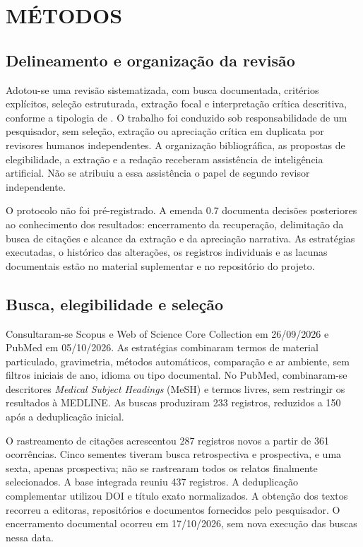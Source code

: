 \section{MÉTODOS}
\subsection{Delineamento e organização da revisão}

Adotou-se uma revisão sistematizada, com busca documentada, critérios explícitos, seleção estruturada, extração focal e interpretação crítica descritiva, conforme a tipologia de \textcite{grant2009}. O trabalho foi conduzido sob responsabilidade de um pesquisador, sem seleção, extração ou apreciação crítica em duplicata por revisores humanos independentes. A organização bibliográfica, as propostas de elegibilidade, a extração e a redação receberam assistência de inteligência artificial. Não se atribuiu a essa assistência o papel de segundo revisor independente.

O protocolo não foi pré-registrado. A emenda 0.7 documenta decisões posteriores ao conhecimento dos resultados: encerramento da recuperação, delimitação da busca de citações e alcance da extração e da apreciação narrativa. As estratégias executadas, o histórico das alterações, os registros individuais e as lacunas documentais estão no material suplementar e no repositório do projeto.

\subsection{Busca, elegibilidade e seleção}

Consultaram-se Scopus e Web of Science Core Collection em 26/09/2026 e PubMed em 05/10/2026. As estratégias combinaram termos de material particulado, gravimetria, métodos automáticos, comparação e ar ambiente, sem filtros iniciais de ano, idioma ou tipo documental. No PubMed, combinaram-se descritores \textit{Medical Subject Headings} (MeSH) e termos livres, sem restringir os resultados à MEDLINE. As buscas produziram 233 registros, reduzidos a 150 após a deduplicação inicial.

O rastreamento de citações acrescentou 287 registros novos a partir de 361 ocorrências. Cinco sementes tiveram busca retrospectiva e prospectiva, e uma sexta, apenas prospectiva; não se rastrearam todos os relatos finalmente selecionados. A base integrada reuniu 437 registros. A deduplicação complementar utilizou DOI e título exato normalizados. A obtenção dos textos recorreu a editoras, repositórios e documentos fornecidos pelo pesquisador. O encerramento documental ocorreu em 17/10/2026, sem nova execução das buscas nessa data.

